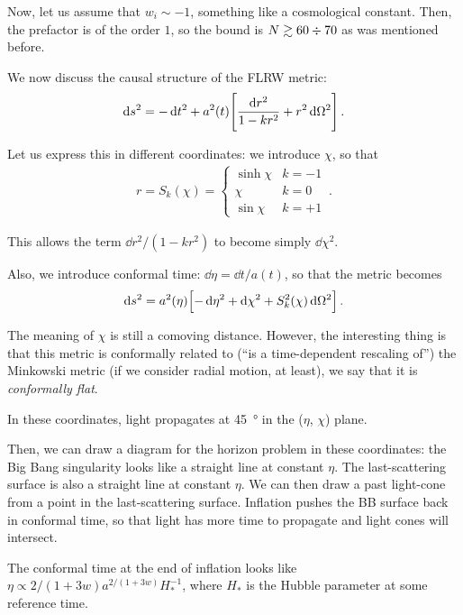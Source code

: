 \documentclass[main.tex]{subfiles}
\begin{document}
Now, let us assume that \(w_i \sim -1\), something like a cosmological constant. Then, the prefactor is of the order \(1\), so the bound is \(N \gtrsim 60 \divisionsymbol 70\) as was mentioned before. 

We now discuss the causal structure of the FLRW metric: 
%
\begin{align}
\dd{s^2} = - \dd{t^2} + a^2(t) \qty[ \frac{ \dd{r^2}}{1 - kr^2} + r^2 \dd{\Omega^2}]
\,.
\end{align}

Let us express this in different coordinates: we introduce \(\chi \), so that 
%
\begin{align}
r = S_k (\chi ) = \begin{cases}
    \sinh \chi & k = -1  \\
    \chi & k = 0 \\
    \sin \chi & k = +1
\end{cases}
\,.
\end{align}

This allows the term \(\dd{r^2} / (1 - kr^2)\) to become simply \(\dd{\chi^2}\). 

Also, we introduce conformal time: \(\dd{\eta } = \dd{t} / a(t)\), so that the metric becomes 
%
\begin{align}
\dd{s^2} = a^2(\eta ) \qty[- \dd{ \eta^2} + \dd{\chi^2} + S_k^2 (\chi ) \dd{\Omega^2}]
\,.
\end{align}

The meaning of \(\chi \) is still a comoving distance. 
However, the interesting thing is that this metric is conformally related to (``is a time-dependent rescaling of'') the Minkowski metric (if we consider radial motion, at least), we say that it is \emph{conformally flat}.

In these coordinates, light propagates at \SI{45}{\degree} in the (\(\eta \), \(\chi \)) plane. 

Then, we can draw a diagram for the horizon problem in these coordinates: the Big Bang singularity looks like a straight line at constant \(\eta \). 
The last-scattering surface is also a straight line at constant \(\eta \).
We can then draw a past light-cone from a point in the last-scattering surface. Inflation pushes the BB surface back in conformal time, so that light has more time to propagate and light cones will intersect. 

\begin{claim}
The conformal time at the end of inflation looks like \(\eta \propto 2 / (1 + 3 w) a^{2 / (1 + 3w)} H_*^{-1}\), where \(H_*\) is the Hubble parameter at some reference time. 
\end{claim}
\end{document}
